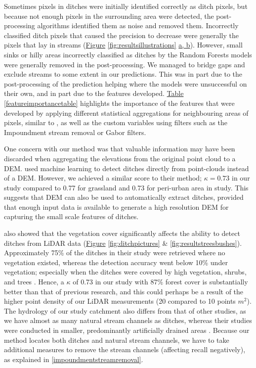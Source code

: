 \documentclass[11pt, review]{elsarticle} %
\begin{document}
Sometimes pixels in ditches were initially identified correctly as ditch pixels, but because not enough pixels in the surrounding area were detected, the post-processing algorithms identified them as noise and removed them. Incorrectly classified ditch pixels that caused the precision to decrease were generally the pixels that lay in streams (\hyperref[fig:resultsillustrations]{Figure} \ref{fig:resultsillustrations} \hyperref[fig:resultsillustrations]{a, b}). However, small sinks or hilly areas incorrectly classified as ditches by the Random Forests models were generally removed in the post-processing. We managed to bridge gaps and exclude streams to some extent in our predictions. This was in part due to the post-processing of the prediction helping where the models were unsuccessful on their own, and in part due to the features developed. \hyperref[featureimportancetable]{Table} \ref{featureimportancetable} highlights the importance of the features that were developed by applying different statistical aggregations for neighbouring areas of pixels, similar to \citet{roelens}, as well as the custom variables using filters such as the Impoundment stream removal or Gabor filters.

One concern with our method was that valuable information may have been discarded when aggregating the elevations from the original point cloud to a DEM. \citet{roelens} used  machine learning to detect ditches directly from point-clouds instead of a DEM. However, we achieved a similar score to their method; $\kappa=0.73$ in our study compared to 0.77 for grassland and 0.73 for peri-urban area in \citet{roelens} study. This suggests that DEM can also be used to automatically extract ditches, provided that enough input data is available to generate a high resolution DEM for capturing the small scale features of ditches. 

\citet{bailly} also showed that the vegetation cover significantly affects the ability to detect ditches from LiDAR data (\hyperref[fig:ditchpictures]{Figure} \ref{fig:ditchpictures} \& \ref{fig:resultstreesbushes}). Approximately 75\% of the ditches in their study were retrieved where no vegetation existed, whereas the detection accuracy went below 10\% under vegetation; especially when the ditches were covered by high vegetation, shrubs, and trees \citep{bailly}. Hence, a $\kappa$ of 0.73 in our study  with  87\% forest cover \citep{krycklancatchment} is substantially better than that of previous research, and this could perhaps be a result of the higher point density of our LiDAR measurements (20 compared to 10 points $m^{2}$). The hydrology of our study catchment also differs from that of other studies, as we have almost as many natural stream channels as ditches, whereas their studies were conducted in smaller, predominantly artificially drained areas \citep{bailly, roelens, rapinel}. Because our method locates both ditches and natural stream channels, we have to take additional measures to remove the stream channels (affecting recall negatively), as explained in \ref{impoundmentstreamremoval}.
\end{document}
